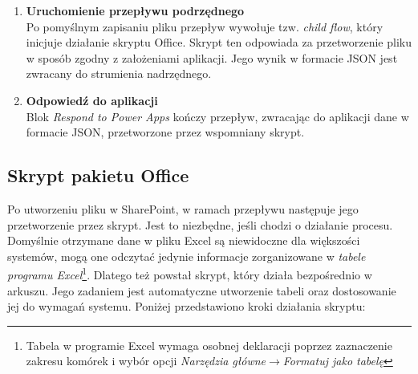 \begin{enumerate}
    \item \textbf{Uruchomienie przepływu podrzędnego} \\
          Po pomyślnym zapisaniu pliku przepływ wywołuje tzw. \textit{child flow}, który inicjuje działanie skryptu Office. Skrypt ten odpowiada za przetworzenie pliku w sposób zgodny z założeniami aplikacji. Jego wynik w formacie JSON jest zwracany do strumienia nadrzędnego.

    \item \textbf{Odpowiedź do aplikacji} \\
          Blok \textit{Respond to Power Apps} kończy przepływ, zwracając do aplikacji dane w formacie JSON, przetworzone przez wspomniany skrypt.
\end{enumerate}

\subsection{Skrypt pakietu Office}
Po utworzeniu pliku w SharePoint, w ramach przepływu następuje jego przetworzenie przez skrypt. Jest to niezbędne, jeśli chodzi o działanie procesu. Domyślnie otrzymane dane w pliku Excel są niewidoczne dla większości systemów, mogą one odczytać jedynie informacje zorganizowane w \emph{tabele programu Excel}\footnote{Tabela w programie Excel wymaga osobnej deklaracji poprzez zaznaczenie zakresu komórek i wybór opcji \emph{Narzędzia główne}$\to$\emph{Formatuj jako tabelę}}. Dlatego też powstał skrypt, który działa bezpośrednio w arkuszu. Jego zadaniem jest automatyczne utworzenie tabeli oraz dostosowanie jej do wymagań systemu. Poniżej przedstawiono kroki działania skryptu:


